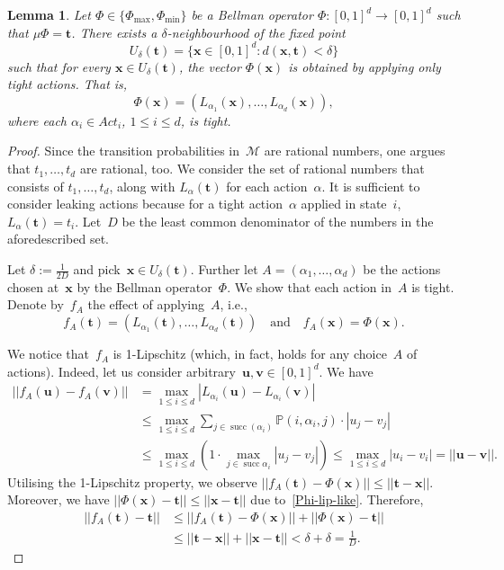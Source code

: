 \documentclass[preprint,12pt]{elsarticle}
\theoremstyle{plain}
\newtheorem{lemma}[theorem]{Lemma}
\theoremstyle{definition}
\theoremstyle{remark}
\theoremstyle{claimstyle}
\newcommand{\prob}{\mathbb{P}}
\DeclareMathOperator*{\suc}{succ}
\begin{document}
\begin{lemma}\label{nbhd-tight}
Let $\Phi \in \{\Phi_{\max}, \Phi_{\min}\}$ be a Bellman operator $\Phi: [0, 1]^d\rightarrow [0, 1]^d$ such that $\mu\Phi = \bm{t}$.
There exists a $\delta$-neighbourhood of the fixed point
\[U_\delta(\bm{t}) = \{\bm{x} \in [0,1]^d : d(\bm{x}, \bm{t}) < \delta \}\]
such that 
for every $\bm{x} \in U_\delta(\bm{t})$, the vector $\Phi(\bm{x})$ is obtained by applying only tight actions.
That is, 
\[\Phi(\bm{x}) = \left(L_{\alpha_1}(\bm{x}), \dots, L_{\alpha_d}(\bm{x})\right),\]
where each $\alpha_i \in Act_i$, $1\leq i\leq d$, is tight.
\end{lemma}
\begin{proof}
Since the transition probabilities in~$\mathcal{M}$ are rational numbers, one argues that $t_1, \dots, t_d$ are rational, too.
We consider the set of rational numbers that consists of
$t_1, \dots, t_d$, along with $L_\alpha(\bm{t})$ for each action~$\alpha$.
It is sufficient to consider leaking actions because for a tight action~$\alpha$ 
applied in state~$i$, $L_\alpha(\bm{t}) = t_i$.
Let~$D$ be the least common denominator of the numbers in the aforedescribed set.



Let $\delta:= \frac{1}{2D}$ and pick~$\bm{x} \in U_\delta(\bm{t})$.
Further let $A = (\alpha_1, \dots, \alpha_d)$ be the actions chosen at~$\bm{x}$ by the Bellman operator~$\Phi$.
We show that each action in~$A$ is tight.
Denote by~$f_A$ the effect of applying~$A$, i.e.,
\[f_A(\bm{t}) = \left(L_{\alpha_1} (\bm{t}), \dots, L_{\alpha_d} (\bm{t})\right) \quad \text{and} \quad
f_A(\bm{x}) = \Phi(\bm{x}).
\]

We notice that~$f_A$ is 1-Lipschitz (which, in fact, holds for any choice~$A$ of actions). 
Indeed, let us consider arbitrary~$\bm{u}, \bm{v} \in [0,1]^d$. 
We have \begin{align*}
	||f_A(\bm{u}) - f_A(\bm{v})|| &= \max_{1 \leq i \leq d} |L_{\alpha_i}(\bm{u}) - L_{\alpha_i}(\bm{v})|\\
	&\leq\max_{1\leq i \leq d} \sum_{j \in \suc(\alpha_i)} \prob(i, \alpha_i, j)\cdot  \left| u_j-v_j \right|\\
	&\leq \max_{1\leq i \leq d} \left(1 \cdot \max_{j \in \suc{\alpha_i}}|u_j - v_j|\right)\leq
	\max_{1\leq i \leq d} \left| u_i-v_i \right| = ||\bm{u} - \bm{v}||.
\end{align*}
Utilising the 1-Lipschitz property, we observe $||f_A(\bm{t}) - \Phi(\bm{x})|| \leq ||\bm{t} - \bm{x}||$.
Moreover, we have $||\Phi(\bm{x}) - \bm{t}|| \leq ||\bm{x} - \bm{t}||$ due to~\cref{Phi-lip-like}. 
Therefore, 
\begin{align}\label{eq:A-optimal}
	||f_A(\bm{t}) - \bm{t}|| &\leq ||f_A(\bm{t}) - \Phi(\bm{x})|| + ||\Phi(\bm{x}) - \bm{t}||\nonumber\\
	&\leq ||\bm{t} - \bm{x}|| + ||\bm{x} - \bm{t}|| < \delta + \delta = \frac{1}{D}. 
\end{align} 


\end{proof}
\end{document}
